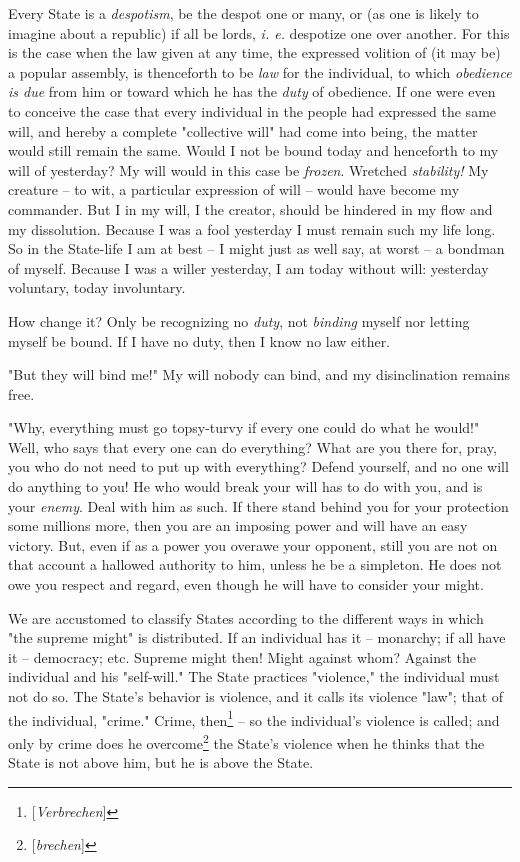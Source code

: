 \documentclass[a4paper]{book}
\begin{document}
Every State is a \textit{despotism}, be the despot one or many, or (as one is 
likely to imagine about a republic) if all be lords, \textit{i. e.} despotize 
one over another. For this is the case when the law given at any time, the 
expressed volition of (it may be) a popular assembly, is thenceforth to be 
\textit{law} for the individual, to which \textit{obedience is due} from him 
or toward which he has the \textit{duty} of obedience. If one were even to 
conceive the case that every individual in the people had expressed the same 
will, and hereby a complete "{}collective will"{} had come into being, the 
matter would still remain the same. Would I not be bound today and henceforth 
to my will of yesterday? My will would in this case be \textit{frozen}. 
Wretched \textit{stability!} My creature -- to wit, a particular expression of 
will -- would have become my commander. But I in my will, I the creator, 
should be hindered in my flow and my dissolution. Because I was a fool 
yesterday I must remain such my life long. So in the State-life I am at best 
-- I might just as well say, at worst -- a bondman of myself. Because I was a 
willer yesterday, I am today without will: yesterday voluntary, today 
involuntary.

How change it? Only be recognizing no \textit{duty}, not \textit{binding} 
myself nor letting myself be bound. If I have no duty, then I know no law 
either.

"{}But they will bind me!"{} My will nobody can bind, and my disinclination 
remains free.

"{}Why, everything must go topsy-turvy if every one could do what he would!"{} 
Well, who says that every one can do everything? What are you there for, pray, 
you who do not need to put up with everything? Defend yourself, and no one 
will do anything to you! He who would break your will has to do with you, and 
is your \textit{enemy}. Deal with him as such. If there stand behind you for 
your protection some millions more, then you are an imposing power and will 
have an easy victory. But, even if as a power you overawe your opponent, still 
you are not on that account a hallowed authority to him, unless he be a 
simpleton. He does not owe you respect and regard, even though he will have to 
consider your might.

We are accustomed to classify States according to the different ways in which 
"{}the supreme might"{} is distributed. If an individual has it -- monarchy; 
if all have it -- democracy; etc. Supreme might then! Might against whom? 
Against the individual and his "{}self-will."{} The State practices 
"{}violence,"{} the individual must not do so. The State's behavior is 
violence, and it calls its violence "{}law"{}; that of the individual, 
"{}crime."{} Crime, then\footnote{[\textit{Verbrechen}]} -- so the 
individual's violence is called; and only by crime does he 
overcome\footnote{[\textit{brechen}]} the State's violence when he thinks that 
the State is not above him, but he is above the State.
\end{document}
